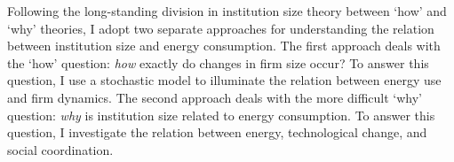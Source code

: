 Following the long-standing division in institution size theory between `how' and `why' theories, I adopt two separate approaches for understanding the relation between institution size and energy consumption. The first approach deals with the `how' question: \emph{how} exactly do changes in firm size occur? To answer this question, I use a stochastic model to illuminate the relation between energy use and firm dynamics. The second approach deals with the more difficult `why' question: \emph{why} is institution size related to energy consumption. To answer this question, I investigate the relation between energy, technological change, and social coordination.














